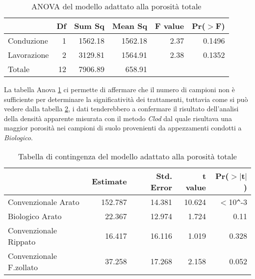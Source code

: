 \documentclass[a4paper]{article}
\begin{document}
\begin{table}[ht]
\centering
\caption{ANOVA del modello adattato alla porosità totale} 
\label{tab:tot_anova}
\begin{tabular}{lrrrrr}

  \hline
 & Df & Sum Sq & Mean Sq & F value & Pr($>$F) \\ 
  \hline
Conduzione & 1 & 1562.18 & 1562.18 & 2.37 & 0.1496 \\ 
  Lavorazione & 2 & 3129.81 & 1564.91 & 2.38 & 0.1352 \\ 
  Totale & 12 & 7906.89 & 658.91 &  &  \\ 
   \hline
\end{tabular}
\end{table}

La tabella Anova \ref{tab:tot_anova} ci permette di affermare che il
numero di campioni non \`e sufficiente per determinare la
significatività dei trattamenti, tuttavia come si può vedere dalla
tabella \ref{tab:tot_sommario}, i dati tenderebbero a confermare il
risultato dell'analisi della densità apparente misurata con il
metodo \emph{Clod} dal quale risultava una maggior porosità nei
campioni di suolo provenienti da appezzamenti condotti a \emph{Biologico}.


\begin{table}[ht]
\centering
\caption{Tabella di contingenza del modello adattato alla porosità totale} 
\label{tab:tot_sommario}
\begin{tabular}{lrrrr}
  \hline
 & Estimate & Std. Error & t value & Pr($>$$|$t$|$) \\ 
  \hline
Convenzionale Arato & 152.787 & 14.381 & 10.624 & $<$10\verb|^|-3 \\ 
  Biologico Arato & 22.367 & 12.974 & 1.724 & 0.11 \\ 
  Convenzionale Rippato & 16.417 & 16.116 & 1.019 & 0.328 \\ 
  Convenzionale F.zollato & 37.258 & 17.268 & 2.158 & 0.052 \\ 
   \hline
\end{tabular}
\end{table}
\end{document}
